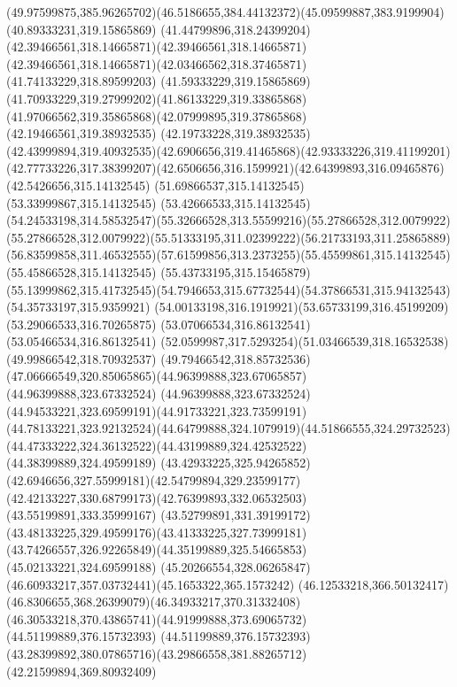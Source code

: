 {{\curveto(49.97599875,385.96265702)(46.5186655,384.44132372)(45.09599887,383.9199904)
\closepath
\moveto(40.89333231,319.15865869)
\curveto(41.44799896,318.24399204)(42.39466561,318.14665871)(42.39466561,318.14665871)
\curveto(42.39466561,318.14665871)(42.03466562,318.37465871)(41.74133229,318.89599203)
\curveto(41.59333229,319.15865869)(41.70933229,319.27999202)(41.86133229,319.33865868)
\curveto(41.97066562,319.35865868)(42.07999895,319.37865868)(42.19466561,319.38932535)
\lineto(42.19733228,319.38932535)
\curveto(42.43999894,319.40932535)(42.6906656,319.41465868)(42.93333226,319.41199201)
\curveto(42.77733226,317.38399207)(42.6506656,316.1599921)(42.64399893,316.09465876)
\lineto(42.5426656,315.14132545)
\lineto(51.69866537,315.14132545)
\lineto(53.33999867,315.14132545)
\lineto(53.42666533,315.14132545)
\curveto(54.24533198,314.58532547)(55.32666528,313.55599216)(55.27866528,312.0079922)
\curveto(55.27866528,312.0079922)(55.51333195,311.02399222)(56.21733193,311.25865889)
\curveto(56.83599858,311.46532555)(57.61599856,313.2373255)(55.45599861,315.14132545)
\lineto(55.45866528,315.14132545)
\lineto(55.43733195,315.15465879)
\curveto(55.13999862,315.41732545)(54.7946653,315.67732544)(54.37866531,315.94132543)
\lineto(54.35733197,315.9359921)
\curveto(54.00133198,316.1919921)(53.65733199,316.45199209)(53.29066533,316.70265875)
\lineto(53.07066534,316.86132541)
\lineto(53.05466534,316.86132541)
\curveto(52.0599987,317.5293254)(51.03466539,318.16532538)(49.99866542,318.70932537)
\curveto(49.79466542,318.85732536)(47.06666549,320.85065865)(44.96399888,323.67065857)
\lineto(44.96399888,323.67332524)
\curveto(44.96399888,323.67332524)(44.94533221,323.69599191)(44.91733221,323.73599191)
\curveto(44.78133221,323.92132524)(44.64799888,324.1079919)(44.51866555,324.29732523)
\curveto(44.47333222,324.36132522)(44.43199889,324.42532522)(44.38399889,324.49599189)
\curveto(43.42933225,325.94265852)(42.6946656,327.55999181)(42.54799894,329.23599177)
\curveto(42.42133227,330.68799173)(42.76399893,332.06532503)(43.55199891,333.35999167)
\curveto(43.52799891,331.39199172)(43.48133225,329.49599176)(43.41333225,327.73999181)
\curveto(43.74266557,326.92265849)(44.35199889,325.54665853)(45.02133221,324.69599188)
\curveto(45.20266554,328.06265847)(46.60933217,357.03732441)(45.1653322,365.1573242)
\curveto(46.12533218,366.50132417)(46.8306655,368.26399079)(46.34933217,370.31332408)
\curveto(46.30533218,370.43865741)(44.91999888,373.69065732)(44.51199889,376.15732393)
\curveto(44.51199889,376.15732393)(43.28399892,380.07865716)(43.29866558,381.88265712)
\lineto(42.21599894,369.80932409)
}}
